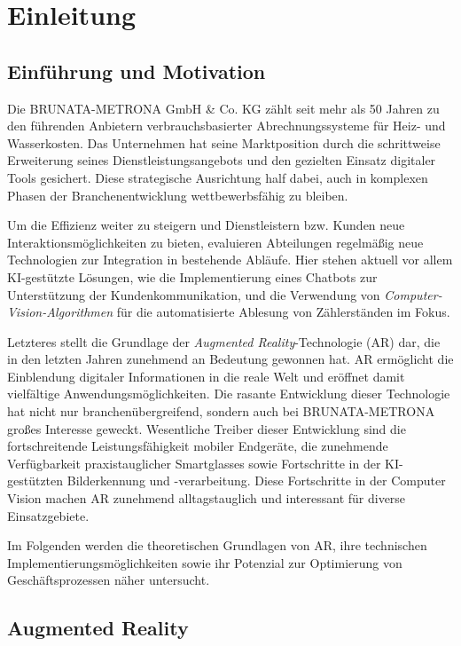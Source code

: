 \chapter{Einleitung}

\section{Einführung und Motivation}

Die BRUNATA-METRONA GmbH \& Co. KG zählt seit mehr als 50 Jahren zu den führenden Anbietern verbrauchsbasierter Abrechnungssysteme für Heiz- und Wasserkosten. Das Unternehmen hat seine Marktposition durch die schrittweise Erweiterung seines Dienstleistungsangebots und den gezielten Einsatz digitaler Tools gesichert. Diese strategische Ausrichtung half dabei, auch in komplexen Phasen der Branchenentwicklung wettbewerbsfähig zu bleiben.

Um die Effizienz weiter zu steigern und Dienstleistern bzw. Kunden neue Interaktionsmöglichkeiten zu bieten, evaluieren Abteilungen regelmäßig neue Technologien zur Integration in bestehende Abläufe. Hier stehen aktuell vor allem KI-gestützte Lösungen, wie die Implementierung eines Chatbots zur Unterstützung der Kundenkommunikation, und die Verwendung von \emph{Computer-Vision-Algorithmen} für die automatisierte Ablesung von Zählerständen im Fokus.

Letzteres stellt die Grundlage der \textit{Augmented Reality}-Technologie (AR) dar, die in den letzten Jahren zunehmend an Bedeutung gewonnen hat. AR ermöglicht die Einblendung digitaler Informationen in die reale Welt und eröffnet damit vielfältige Anwendungsmöglichkeiten. Die rasante Entwicklung dieser Technologie hat nicht nur branchenübergreifend, sondern auch bei BRUNATA-METRONA großes Interesse geweckt. Wesentliche Treiber dieser Entwicklung sind die fortschreitende Leistungsfähigkeit mobiler Endgeräte, die zunehmende Verfügbarkeit praxistauglicher Smartglasses sowie Fortschritte in der KI-gestützten Bilderkennung und -verarbeitung. Diese Fortschritte in der Computer Vision machen AR zunehmend alltagstauglich und interessant für diverse Einsatzgebiete. \cite{verma2022advances, boulanger2024applications, doerner2022virtual}

Im Folgenden werden die theoretischen Grundlagen von AR, ihre technischen Implementierungsmöglichkeiten sowie ihr Potenzial zur Optimierung von Geschäftsprozessen näher untersucht.

\section{Augmented Reality}

